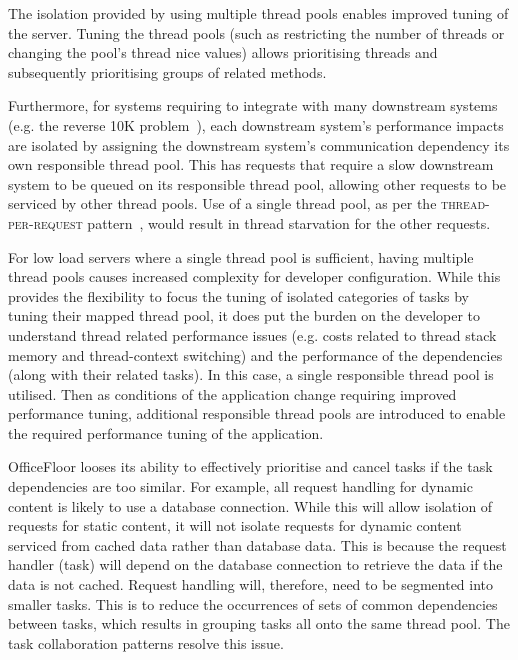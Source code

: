 \documentclass[prodmode]{style/acmlarge}
\begin{document}
The isolation provided by using multiple thread pools enables improved tuning of
the server.  Tuning the thread pools (such as restricting the number of threads
or changing the pool's thread nice values) allows prioritising threads and
subsequently prioritising groups of related methods.

Furthermore, for systems requiring to integrate with many downstream systems
(e.g. the reverse 10K problem~\cite{reverse-ten-k-problem}), each downstream
system's performance impacts are isolated by assigning the downstream system's
communication dependency its own responsible thread pool.  This has requests
that require a slow downstream system to be queued on its responsible thread
pool, allowing other requests to be serviced by other thread pools.  Use of a
single thread pool, as per the \textsc{thread-per-request}
pattern~\cite{thread-per-request}, would result in thread starvation for the
other requests.

For low load servers where a single thread pool is sufficient, having multiple
thread pools causes increased complexity for developer configuration.  While
this provides the flexibility to focus the tuning of isolated categories of
tasks by tuning their mapped thread pool, it does put the burden on the
developer to understand thread related performance issues (e.g. costs related to
thread stack memory and thread-context switching) and the performance of the
dependencies (along with their related tasks).  In this case, a single
responsible thread pool is utilised.  Then as conditions of the application
change requiring improved performance tuning, additional responsible thread
pools are introduced to enable the required performance tuning of the
application.

OfficeFloor looses its ability to effectively prioritise and cancel tasks if the
task dependencies are too similar.  For example, all request handling for
dynamic content is likely to use a database connection.  While this will allow
isolation of requests for static content, it will not isolate requests for
dynamic content serviced from cached data rather than database data.  This is
because the request handler (task) will depend on the database connection to
retrieve the data if the data is not cached.  Request handling will, therefore,
need to be segmented into smaller tasks.  This is to reduce the occurrences of
sets of common dependencies between tasks, which results in grouping tasks all
onto the same thread pool.  The task collaboration patterns resolve this issue.
\end{document}
